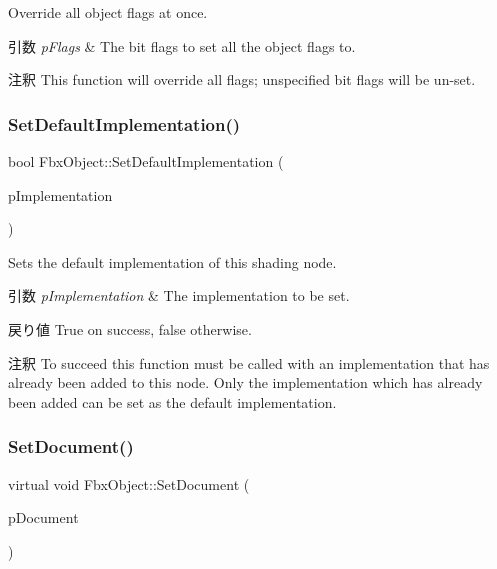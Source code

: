 Override all object flags at once. 
\begin{DoxyParams}{引数}
{\em p\+Flags} & The bit flags to set all the object flags to. \\
\hline
\end{DoxyParams}
\begin{DoxyRemark}{注釈}
This function will override all flags; unspecified bit flags will be un-\/set. 
\end{DoxyRemark}
\mbox{\label{class_fbx_object_ac216eb622d77659c18092b202632aaa9}} 
\subsubsection{\texorpdfstring{Set\+Default\+Implementation()}{SetDefaultImplementation()}}
{\footnotesize\ttfamily bool Fbx\+Object\+::\+Set\+Default\+Implementation (\begin{DoxyParamCaption}\item[{\hyperlink{class_fbx_implementation}{Fbx\+Implementation} $\ast$}]{p\+Implementation }\end{DoxyParamCaption})}

Sets the default implementation of this shading node. 
\begin{DoxyParams}{引数}
{\em p\+Implementation} & The implementation to be set. \\
\hline
\end{DoxyParams}
\begin{DoxyReturn}{戻り値}
{\ttfamily True} on success, {\ttfamily false} otherwise. 
\end{DoxyReturn}
\begin{DoxyRemark}{注釈}
To succeed this function must be called with an implementation that has already been added to this node. Only the implementation which has already been added can be set as the default implementation. 
\end{DoxyRemark}
\mbox{\label{class_fbx_object_a5f01a45e03bbf2c243ae9ef71d9050cf}} 
\subsubsection{\texorpdfstring{Set\+Document()}{SetDocument()}}
{\footnotesize\ttfamily virtual void Fbx\+Object\+::\+Set\+Document (\begin{DoxyParamCaption}\item[{\hyperlink{class_fbx_document}{Fbx\+Document} $\ast$}]{p\+Document }\end{DoxyParamCaption})\hspace{0.3cm}{\ttfamily [virtual]}}



